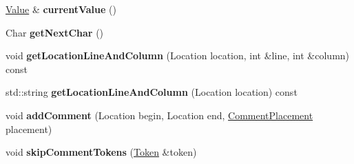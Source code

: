 \begin{DoxyCompactItemize}
\item 
\hypertarget{class_json_1_1_our_reader_a2acd5b1d53e7d7e17c21ff8e96edc09d}{}\hyperlink{class_json_1_1_value}{Value} \& {\bfseries current\+Value} ()\label{class_json_1_1_our_reader_a2acd5b1d53e7d7e17c21ff8e96edc09d}

\item 
\hypertarget{class_json_1_1_our_reader_a298285d035fdbc554caae09d9f0a5859}{}Char {\bfseries get\+Next\+Char} ()\label{class_json_1_1_our_reader_a298285d035fdbc554caae09d9f0a5859}

\item 
\hypertarget{class_json_1_1_our_reader_a9f47ad324225df1e68bda7dc451845c9}{}void {\bfseries get\+Location\+Line\+And\+Column} (Location location, int \&line, int \&column) const \label{class_json_1_1_our_reader_a9f47ad324225df1e68bda7dc451845c9}

\item 
\hypertarget{class_json_1_1_our_reader_a579a7d2e493f63c4b122103844e3cedd}{}std\+::string {\bfseries get\+Location\+Line\+And\+Column} (Location location) const \label{class_json_1_1_our_reader_a579a7d2e493f63c4b122103844e3cedd}

\item 
\hypertarget{class_json_1_1_our_reader_ad7318c37469a9106069a236fb4b10e1f}{}void {\bfseries add\+Comment} (Location begin, Location end, \hyperlink{namespace_json_a4fc417c23905b2ae9e2c47d197a45351}{Comment\+Placement} placement)\label{class_json_1_1_our_reader_ad7318c37469a9106069a236fb4b10e1f}

\item 
\hypertarget{class_json_1_1_our_reader_a856dea44d92578c276856d7a65a4ebdc}{}void {\bfseries skip\+Comment\+Tokens} (\hyperlink{class_json_1_1_our_reader_1_1_token}{Token} \&token)\label{class_json_1_1_our_reader_a856dea44d92578c276856d7a65a4ebdc}

\end{DoxyCompactItemize}
